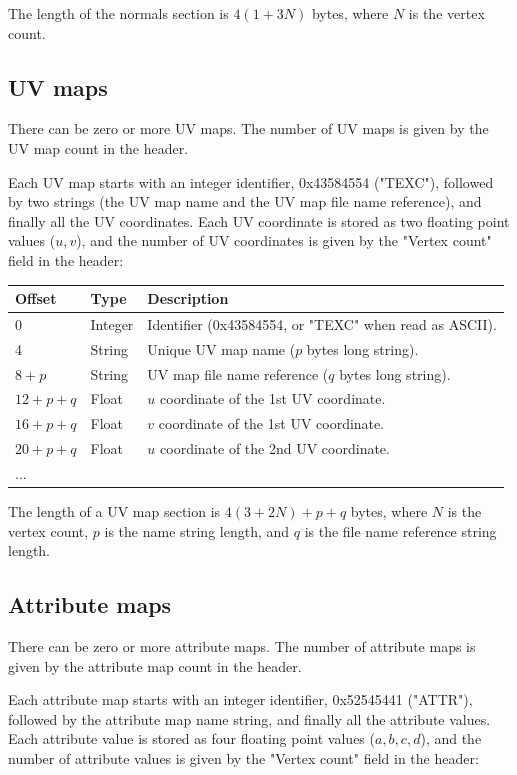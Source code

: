 The length of the normals section is $4(1+3N)$ bytes, where $N$ is the vertex
count.

\subsection{UV maps}
There can be zero or more UV maps. The number of UV maps is given by the
UV map count in the header.

Each UV map starts with an integer identifier, 0x43584554 ("TEXC"), followed
by two strings (the UV map name and the UV map file name reference), and
finally all the UV coordinates. Each UV coordinate is stored as two floating point
values ($u,v$), and the number of UV coordinates is given by the "Vertex count"
field in the header:

\begin{tabular}{|l|l|l|}\hline
\textbf{Offset} &  \textbf{Type} & \textbf{Description}\\ \hline
0 & Integer & Identifier (0x43584554, or "TEXC" when read as ASCII).\\ \hline
4 & String & Unique UV map name ($p$ bytes long string).\\ \hline
$8+p$ & String & UV map file name reference ($q$ bytes long string).\\ \hline
$12+p+q$ & Float & $u$ coordinate of the 1st UV coordinate.\\ \hline
$16+p+q$ & Float & $v$ coordinate of the 1st UV coordinate.\\ \hline
$20+p+q$ & Float & $u$ coordinate of the 2nd UV coordinate.\\ \hline
... & & \\ \hline
\end{tabular}

The length of a UV map section is $4(3+2N)+p+q$ bytes, where $N$ is the vertex
count, $p$ is the name string length, and $q$ is the file name reference string
length.

\subsection{Attribute maps}
There can be zero or more attribute maps. The number of attribute maps is given by the
attribute map count in the header.

Each attribute map starts with an integer identifier, 0x52545441 ("ATTR"), followed
by the attribute map name string, and finally all the attribute values. Each attribute
value is stored as four floating point values ($a,b,c,d$), and the number of
attribute values is given by the "Vertex count" field in the header:

